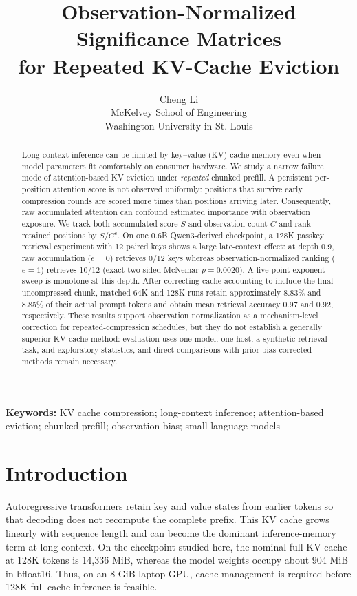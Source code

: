 \documentclass[10pt,twocolumn]{article}
\title{Observation-Normalized Significance Matrices\\for Repeated KV-Cache Eviction}
\author{Cheng Li\\McKelvey School of Engineering\\Washington University in St. Louis}
\date{}
\begin{document}
\maketitle

\begin{abstract}
Long-context inference can be limited by key--value (KV) cache memory even when model parameters fit comfortably on consumer hardware. We study a narrow failure mode of attention-based KV eviction under \emph{repeated} chunked prefill. A persistent per-position attention score is not observed uniformly: positions that survive early compression rounds are scored more times than positions arriving later. Consequently, raw accumulated attention can confound estimated importance with observation exposure. We track both accumulated score $S$ and observation count $C$ and rank retained positions by $S/C^e$. On one 0.6B Qwen3-derived checkpoint, a 128K passkey retrieval experiment with 12 paired keys shows a large late-context effect: at depth 0.9, raw accumulation ($e=0$) retrieves 0/12 keys whereas observation-normalized ranking ($e=1$) retrieves 10/12 (exact two-sided McNemar $p=0.0020$). A five-point exponent sweep is monotone at this depth. After correcting cache accounting to include the final uncompressed chunk, matched 64K and 128K runs retain approximately 8.83\% and 8.85\% of their actual prompt tokens and obtain mean retrieval accuracy 0.97 and 0.92, respectively. These results support observation normalization as a mechanism-level correction for repeated-compression schedules, but they do not establish a generally superior KV-cache method: evaluation uses one model, one host, a synthetic retrieval task, and exploratory statistics, and direct comparisons with prior bias-corrected methods remain necessary.
\end{abstract}

\noindent\textbf{Keywords:} KV cache compression; long-context inference; attention-based eviction; chunked prefill; observation bias; small language models

\section{Introduction}
Autoregressive transformers retain key and value states from earlier tokens so that decoding does not recompute the complete prefix. This KV cache grows linearly with sequence length and can become the dominant inference-memory term at long context. On the checkpoint studied here, the nominal full KV cache at 128K tokens is 14,336 MiB, whereas the model weights occupy about 904 MiB in bfloat16. Thus, on an 8 GiB laptop GPU, cache management is required before 128K full-cache inference is feasible.
\end{document}
